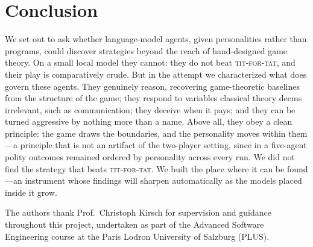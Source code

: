 \section{Conclusion}
\label{sec:conclusion}

We set out to ask whether language-model agents, given personalities rather than programs, could discover strategies beyond the reach of hand-designed game theory. On a small local model they cannot: they do not beat \textsc{tit-for-tat}, and their play is comparatively crude. But in the attempt we characterized what does govern these agents. They genuinely reason, recovering game-theoretic baselines from the structure of the game; they respond to variables classical theory deems irrelevant, such as communication; they deceive when it pays; and they can be turned aggressive by nothing more than a name. Above all, they obey a clean principle: the game draws the boundaries, and the personality moves within them---a principle that is not an artifact of the two-player setting, since in a five-agent polity outcomes remained ordered by personality across every run. We did not find the strategy that beats \textsc{tit-for-tat}. We built the place where it can be found---an instrument whose findings will sharpen automatically as the models placed inside it grow.

\begin{acks}
The authors thank Prof.\ Christoph Kirsch for supervision and guidance throughout this project, undertaken as part of the Advanced Software Engineering course at the Paris Lodron University of Salzburg (PLUS).
\end{acks}





